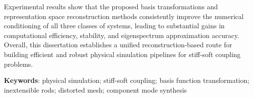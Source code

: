 Experimental results show that the proposed basis transformations and representation space reconstruction methods consistently improve the numerical conditioning of all three classes of systems, leading to substantial gains in computational efficiency, stability, and eigenspectrum approximation accuracy. Overall, this dissertation establishes a unified reconstruction-based route for building efficient and robust physical simulation pipelines for stiff-soft coupling problems.

\bigskip
\noindent \textbf{Keywords}: physical simulation; stiff-soft coupling; basis function transformation; inextensible rods; distorted mesh; component mode synthesis
